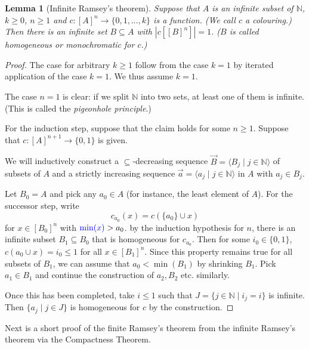 \documentclass[a4paper, 11pt]{amsart}
\newtheorem{lemma}[lemma]{Lemma}
\theoremstyle{remark}
\newcommand{\NN}{\mathbb{N}}
\begin{document}
\begin{lemma}[Infinite Ramsey's theorem] 
Suppose that $A$ is an infinite subset of $\NN$, $k\geq 0$, $n\geq 1$ and $c\colon [A]^n\rightarrow \{0,1,\dots,k\}$ is a function. 
(We call $c$ a \emph{colouring}.) 
Then there is an infinite set $B\subseteq A$ with $|c[[B]^n]|=1$. 
($B$ is called \emph{homogeneous} or \emph{monochromatic} for $c$.) 
\end{lemma} 
\begin{proof} 
The case for arbitrary $k\geq 1$ follow from the case $k=1$ by iterated application of the case $k=1$. 
We thus assume $k=1$. 

The case $n=1$ is clear: if we split $\NN$ into two sets, at least one of them is infinite. (This is called the \emph{pigeonhole principle}.) 

For the induction step, suppose that the claim holds for some $n\geq 1$. 
Suppose that $c\colon [A]^{n+1}\rightarrow \{0,1\}$ is given. 


We will inductively construct a $\subseteq$-decreasing sequence $\vec{B}=\langle B_j \mid j \in\NN \rangle$ of subsets of $A$ and a strictly increasing sequence $\vec{a}=\langle a_j \mid j\in\NN \rangle$ in $A$ with $a_j\in B_j$. 

Let $B_0=A$ and pick any $a_0\in A$ (for instance, the least element of $A$). 
For the successor step, write 
$$ c_{a_0}(x) = c(\{a_0\}\cup x) $$ 
for $x \in [B_0]^{n}$ with ${\color{blue}\min(x)} > a_0$. 
by the induction hypothesis for $n$, there is an infinite subset $B_1\subseteq B_0$ that is homogeneous for $c_{a_0}$. 
Then for some $i_0\in \{0,1\}$, $c(a_0 \cup x) = i_0 \leq 1$ for all $x\in [B_1]^n$. 
Since this property remains true for all subsets of $B_1$, we can assume that $a_0 < \min(B_1)$ by shrinking $B_1$. 
Pick $a_1\in B_1$ and continue the construction of $a_2, B_2$ etc. similarly. 

Once this has been completed, take $i\leq 1$ such that $J=\{ j \in \NN \mid i_j =i \}$ is infinite. 
Then $\{a_j \mid j\in J\}$ is homogeneous for $c$ by the construction. 
\end{proof} 




Next is a short proof of the finite Ramsey's theorem from the infinite Ramsey's theorem via the Compactness Theorem. 
\end{document}
